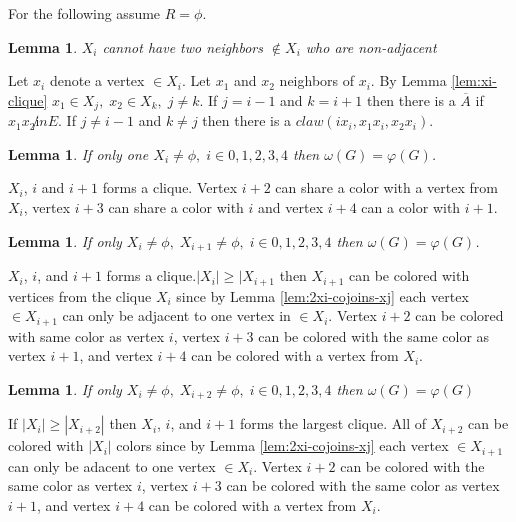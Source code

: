\documentclass[12pt]{article}
\newtheorem{Lemma}[Theorem]{Lemma}
\begin{document}
For the following assume $R = \phi$. 

\begin{Lemma}\label{lem:xi-neighbor-adjacent}
$X_i$ cannot have two neighbors $\not \in X_i$ who are non-adjacent
\end{Lemma}
 Let $x_i$ denote a vertex $\in X_i$. Let $x_1$ and $x_2$ neighbors of $x_i$. By Lemma \ref{lem:xi-clique} $x_1 \in X_j,\; x_2 \in X_k,\; j \neq k$. If $j=i-1$ and $k=i+1$ then there is a $\overline{A}$ if $x_1x_2 \not in E$. If $j \neq i-1$ and $k \neq j$ then there is a $claw (ix_i, x_1x_i,x_2x_i)$.

\begin{Lemma}\label{lem:one-clique}
If only one $X_i \neq \phi,\; i \in {0, 1, 2, 3, 4}$ then $\omega(G) = \varphi(G)$.
\end{Lemma}
 $X_i$, $i$ and $i+1$ forms a clique. Vertex $i+2$ can share a color with a vertex from $X_i$, vertex $i+3$ can share a color with $i$ and vertex $i+4$ can a color with $i+1$.

\begin{Lemma}\label{lem:xi-xi2-clique}
If only $X_i \neq \phi,\; X_{i+1} \neq \phi,\; i \in {0, 1, 2, 3, 4}$ then $\omega(G) = \varphi(G)$.
\end{Lemma}
 $X_i$, $i$, and $i+1$ forms a clique.$|X_i| \geq |X_{i+1}$ then $X_{i+1}$ can be colored with vertices from the clique $X_i$ since by Lemma \ref{lem:2xi-cojoins-xj} each vertex $\in X_{i+1}$ can only be adjacent to one vertex in $\in X_{i}$. Vertex $i+2$ can be colored with same color as vertex $i$, vertex $i+3$ can be colored with the same color as vertex $i+1$, and vertex $i+4$ can be colored with a vertex from $X_i$.

\begin{Lemma}\label{lem:xi-xi3-clique}
If only $X_i \neq \phi,\; X_{i+2} \neq \phi,\; i \in {0, 1, 2, 3,4}$ then $\omega(G) = \varphi(G)$
\end{Lemma}
 If $|X_i| \geq |X_{i+2}|$ then $X_i$, $i$, and $i+1$ forms the largest clique. All of $X_{i+2}$ can be colored with $|X_i|$ colors since by Lemma \ref{lem:2xi-cojoins-xj} each vertex $\in X_{i+1}$ can only be adacent to one vertex $\in X_{i}$. Vertex $i+2$ can be colored with the same color as vertex $i$, vertex $i+3$ can be colored with the same color as vertex $i+1$, and vertex $i+4$ can be colored with a vertex from $X_i$.
\end{document}
